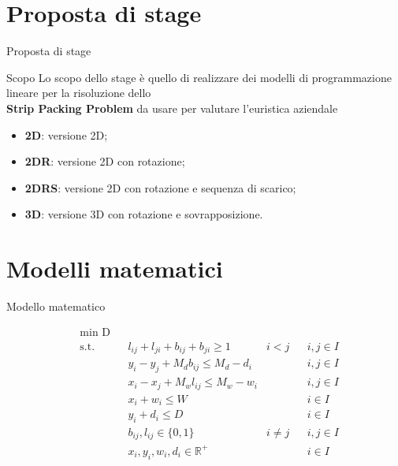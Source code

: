 \documentclass{beamer}
\begin{document}
\section{Proposta di stage}

\begin{frame}{Proposta di stage}
	\begin{alertblock}{Scopo}
		Lo scopo dello stage \`e  quello di realizzare dei modelli di programmazione lineare per la risoluzione dello \\ \textbf{Strip Packing Problem} da usare per valutare l'euristica aziendale
	\end{alertblock}
	\begin{itemize}
		\item \textbf{2D}: versione 2D;
		\item \textbf{2DR}: versione 2D con rotazione;
		\item \textbf{2DRS}: versione 2D con rotazione e sequenza di scarico;
		\item \textbf{3D}: versione 3D con rotazione e sovrapposizione.
	\end{itemize}
\end{frame}

\section{Modelli matematici}
\begin{frame}{Modello matematico}
	\begin{center}
		\begin{align*}
			& \underset{}{\text{min D}} \\
			  & \text{s.t.} &   & l_{ij} + l_{ji} + b_{ij} + b_{ji} \geq 1      & i < j    &   & i,j \in I \\
			  &             &   & y_i - y_j + M_d b_{ij} \leq M_d - d_i         &          &   & i,j \in I \\
			  &             &   & x_i - x_j + M_w l_{ij} \leq M_w - w_i         &          &   & i,j \in I \\
			  &             &   & x_i + w_i \leq W                              &          &   & i \in I   \\
			  &             &   & y_i + d_i \leq D                              &          &   & i \in I   \\
			  &             &   & b_{ij}, l_{ij} \in \{0,1\}                    & i \neq j &   & i,j \in I \\
			  &             &   & x_{i}, y_{i}, w_{i}, d_{i} \in \mathbb{R}^{+} &          &   & i \in I   
		\end{align*}
	\end{center}
		
\end{frame}
\end{document}
